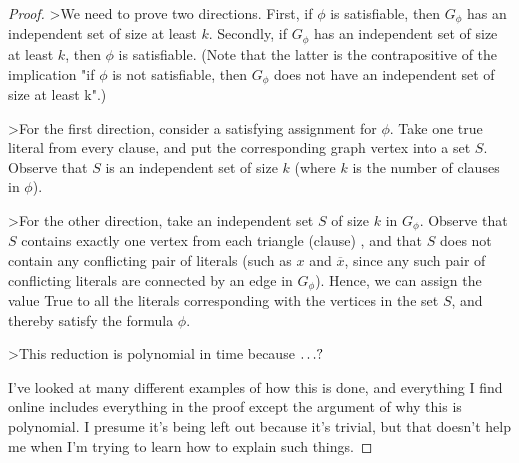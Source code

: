 \documentclass[10pt,landscape]{article}
\theoremstyle{plain}%
\theoremstyle{definition}
\theoremstyle{remark}
\begin{document}
\begin{multicols}{3}
\begin{proof}
>We need to prove two directions. First, if $\phi$ is satisfiable, then $G_\phi$ has an independent set of size at least $k$. Secondly, if $G_\phi$ has an independent set of size at least $k$, then $\phi$ is satisfiable. (Note that the latter is the contrapositive of the implication "if $\phi$ is not satisfiable, then $G_\phi$ does not have an independent set of size at least k".)

>For the first direction, consider a satisfying assignment for $\phi$. Take one true literal from every clause, and put the corresponding graph vertex into a set $S$. Observe that $S$ is an independent set of size $k$ (where $k$ is the number of clauses in $\phi$).

>For the other direction, take an independent set $S$ of size $k$ in $G_\phi$. Observe that $S$ contains exactly one vertex from each triangle (clause) , and that $S$ does not contain any conflicting pair of literals (such as $x$ and $\overline{x}$, since any such pair of conflicting literals are connected by an edge in $G_\phi$). Hence, we can assign the value True to all the literals corresponding with the vertices in the set $S$, and thereby satisfy the formula $\phi$.

>This reduction is polynomial in time because $\Huge\dots?$

I've looked at many different examples of how this is done, and everything I find online includes everything in the proof except the argument of why this is polynomial. I presume it's being left out because it's trivial, but that doesn't help me when I'm trying to learn how to explain such things.


\end{proof}


\end{multicols}
\end{document}
